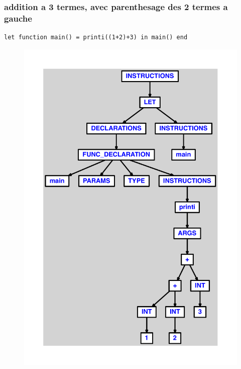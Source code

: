 \documentclass{article}
\begin{document}
\subsubsection{addition a 3 termes, avec parenthesage des 2 termes a gauche}
\begin{lstlisting}
let function main() = printi((1+2)+3) in main() end
\end{lstlisting}
\newpage
\begin{figure}[H]
\centering
\includegraphics[max width=\textwidth]{ast/ast_95.pdf}
\end{figure}
\newpage
\end{document}
